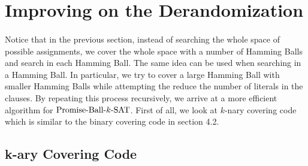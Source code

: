 \documentclass[a4paper,12pts]{article}
\newcommand{\SAT}{\textnormal{$k$-SAT}}
\newcommand{\PBS}{\textnormal{Promise-Ball-$\SAT$}}
\begin{document}
\section{Improving on the Derandomization\cite{Moser11}}
\paragraph{} Notice that in the previous section, instead of searching the whole space of possible assignments, we cover the whole space with a number of Hamming Balls and search in each Hamming Ball. The same idea can be used when searching in a Hamming Ball. In particular, we try to cover a large Hamming Ball with smaller Hamming Balls while attempting the reduce the number of literals in the clauses. By repeating this process recursively, we arrive at a more efficient algorithm for $\PBS$. First of all, we look at $k$-nary covering code which is similar to the binary covering code in section 4.2.
\subsection{k-ary Covering Code}
\end{document}
